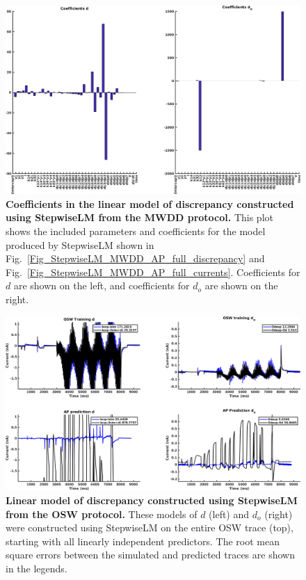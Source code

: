 \documentclass[11pt,a4paper,oneside]{article}
\begin{document}
\clearpage

\begin{figure}[t]
\begin{center}
\includegraphics[scale=0.42]{Figures/StepwiseLM_MWDD_AP_full_coefficients.png}
\caption{\textbf{Coefficients in the linear model of discrepancy constructed using StepwiseLM from the MWDD protocol.} This plot shows the included parameters and coefficients for the model produced by StepwiseLM shown in Fig.~\ref{Fig_StepwiseLM_MWDD_AP_full_discrepancy} and Fig.~\ref{Fig_StepwiseLM_MWDD_AP_full_currents}. Coefficients for $d$ are shown on the left, and coefficients for $d_o$ are shown on the right.} 
\label{Fig_StepwiseLM_MWDD_AP_full_coefficients}
\end{center}
\end{figure}

\clearpage

\begin{figure}[t]
\begin{center}
\includegraphics[scale=0.42]{Figures/StepwiseLM_OSW_AP_full_discrepancy.png}
\caption{\textbf{Linear model of discrepancy constructed using StepwiseLM from the OSW protocol.} These models of $d$ (left) and $d_o$ (right) were constructed using StepwiseLM on the entire OSW trace (top), starting with all linearly independent predictors. The root mean square errors between the simulated and predicted traces are shown in the legends. } 
\label{Fig_StepwiseLM_OSW_AP_full_discrepancy}
\end{center}
\end{figure}
\end{document}
